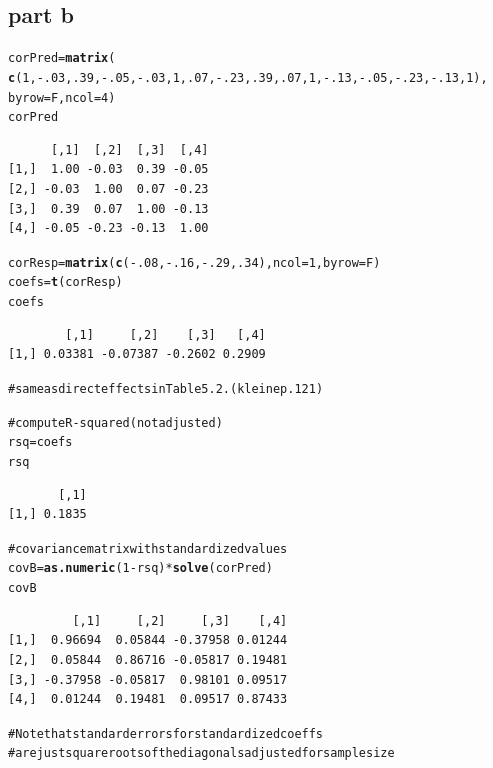 \documentclass{article}\usepackage{graphicx, color}
\makeatletter
\newcommand{\hlfunctioncall}[1]{\textcolor[rgb]{0.501960784313725,0,0.329411764705882}{\textbf{#1}}}%
\newcommand{\hlcomment}[1]{\textcolor[rgb]{0.180392156862745,0.6,0.341176470588235}{#1}}%
\newenvironment{kframe}{%
 \def\at@end@of@kframe{}%
 \ifinner\ifhmode%
  \def\at@end@of@kframe{\end{minipage}}%
  \begin{minipage}{\columnwidth}%
 \fi\fi%
 \def\FrameCommand##1{\hskip\@totalleftmargin \hskip-\fboxsep
 \colorbox{shadecolor}{##1}\hskip-\fboxsep
     \hskip-\linewidth \hskip-\@totalleftmargin \hskip\columnwidth}%
 \MakeFramed {\advance\hsize-\width
   \@totalleftmargin\z@ \linewidth\hsize
   \@setminipage}}%
 {\par\unskip\endMakeFramed%
 \at@end@of@kframe}
\newenvironment{knitrout}{}{} %
\makeatother
\begin{document}
\subsection*{part b}
\begin{knitrout}
\color{fgcolor}\begin{kframe}
\begin{alltt}
corPred=\hlfunctioncall{matrix}(
    \hlfunctioncall{c}(1,-.03,.39,-.05,-.03,1,.07,-.23,.39,.07,1,-.13,-.05,-.23,-.13,1),
    byrow=F,ncol=4)
corPred
\end{alltt}
\begin{verbatim}
      [,1]  [,2]  [,3]  [,4]
[1,]  1.00 -0.03  0.39 -0.05
[2,] -0.03  1.00  0.07 -0.23
[3,]  0.39  0.07  1.00 -0.13
[4,] -0.05 -0.23 -0.13  1.00
\end{verbatim}
\begin{alltt}
corResp=\hlfunctioncall{matrix}(\hlfunctioncall{c}(-.08,-.16,-.29,.34),ncol=1,byrow=F)
coefs = \hlfunctioncall{t}(corResp)%
coefs 
\end{alltt}
\begin{verbatim}
        [,1]     [,2]    [,3]   [,4]
[1,] 0.03381 -0.07387 -0.2602 0.2909
\end{verbatim}
\begin{alltt}
\hlcomment{# same as direct effects in Table 5.2. (kleine p.121)}

\hlcomment{# compute R-squared (not adjusted)}
rsq=coefs%
rsq
\end{alltt}
\begin{verbatim}
       [,1]
[1,] 0.1835
\end{verbatim}
\begin{alltt}
\hlcomment{# covariance matrix with standardized values}
covB = \hlfunctioncall{as.numeric}(1-rsq)*\hlfunctioncall{solve}(corPred)
covB
\end{alltt}
\begin{verbatim}
         [,1]     [,2]     [,3]    [,4]
[1,]  0.96694  0.05844 -0.37958 0.01244
[2,]  0.05844  0.86716 -0.05817 0.19481
[3,] -0.37958 -0.05817  0.98101 0.09517
[4,]  0.01244  0.19481  0.09517 0.87433
\end{verbatim}
\begin{alltt}
\hlcomment{# Note that standard errors for standardized coeffs }
\hlcomment{# are just square roots of the diagonals adjusted for sample size}


\end{alltt}
\end{kframe}
\end{knitrout}
\end{document}
